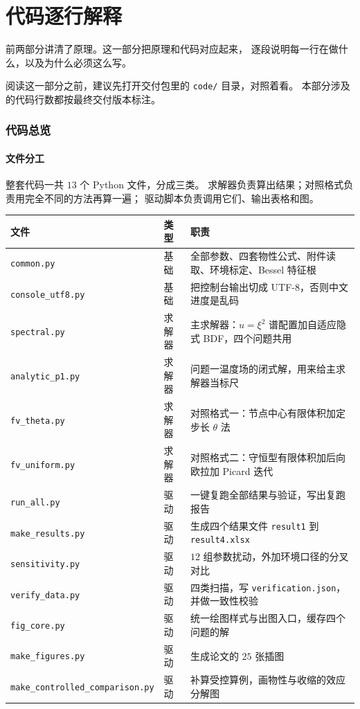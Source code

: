 \part{代码逐行解释}

前两部分讲清了原理。这一部分把原理和代码对应起来，
逐段说明每一行在做什么，以及为什么必须这么写。

阅读这一部分之前，建议先打开交付包里的 \texttt{code/} 目录，对照着看。
本部分涉及的代码行数都按最终交付版本标注。

\section{代码总览}

\subsection{文件分工}

整套代码一共 $13$ 个 Python 文件，分成三类。
求解器负责算出结果；对照格式负责用完全不同的方法再算一遍；
驱动脚本负责调用它们、输出表格和图。

\begin{center}
\begin{tabular}{@{}llp{7.4cm}@{}}
\toprule
文件 & 类型 & 职责 \\
\midrule
\texttt{common.py} & 基础 & 全部参数、四套物性公式、附件读取、环境标定、Bessel 特征根 \\
\texttt{console\_utf8.py} & 基础 & 把控制台输出切成 UTF-8，否则中文进度是乱码 \\
\texttt{spectral.py} & 求解器 & 主求解器：$u=\xi^2$ 谱配置加自适应隐式 BDF，四个问题共用 \\
\texttt{analytic\_p1.py} & 求解器 & 问题一温度场的闭式解，用来给主求解器当标尺 \\
\texttt{fv\_theta.py} & 求解器 & 对照格式一：节点中心有限体积加定步长 $\theta$ 法 \\
\texttt{fv\_uniform.py} & 求解器 & 对照格式二：守恒型有限体积加后向欧拉加 Picard 迭代 \\
\texttt{run\_all.py} & 驱动 & 一键复跑全部结果与验证，写出复跑报告 \\
\texttt{make\_results.py} & 驱动 & 生成四个结果文件 \texttt{result1} 到 \texttt{result4.xlsx} \\
\texttt{sensitivity.py} & 驱动 & $12$ 组参数扰动，外加环境口径的分叉对比 \\
\texttt{verify\_data.py} & 驱动 & 四类扫描，写 \texttt{verification.json}，并做一致性校验 \\
\texttt{fig\_core.py} & 驱动 & 统一绘图样式与出图入口，缓存四个问题的解 \\
\texttt{make\_figures.py} & 驱动 & 生成论文的 $25$ 张插图 \\
\texttt{make\_controlled\_comparison.py} & 驱动 & 补算受控算例，画物性与收缩的效应分解图 \\
\bottomrule
\end{tabular}
\end{center}

